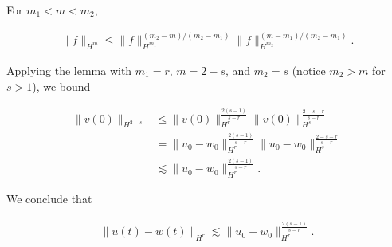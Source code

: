 \documentclass[handout]{beamer}
\numberwithin{equation}{section}
\begin{document}
 \begin{frame}
     \begin{lemma}[Interpolation]
  For $m_{1} < m < m_{2}$,
  
  
  \begin{equation*}
  \begin{split}
    \| f \|_{H^{m}} \le \| f \|_{H^{m_{1}}}^{(m_{2}-m)/(m_{2} - m_{1})} \| f
    \|_{H^{m_{2}}}^{(m -m_{1})/(m_{2} - m_{1})}.
  \end{split}
  \end{equation*}
  
  
  
   
  
\label{lem:interp}
\end{lemma}

Applying the lemma with $m_{1} =r$, $m = 2-s$, and $m_{2} = s$ (notice
$m_{2} > m$ for $s > 1$), we bound 


\begin{equation*}
\begin{split}
    \| v(0) \|_{H^{2-s}} 
    & \le \| v(0) \|_{H^{r}}^{\frac{2(s-1)}{s-r}} \|v(0)
  \|_{H^{s}}^{\frac{2-s-r}{s-r}}
  \\
  & = \| u_{0} - w_{0} \|_{H^{r}}^{\frac{2(s-1)}{s-r}} \|u_{0} - w_{0}
  \|_{H^{s}}^{\frac{2-s-r}{s-r}}
  \\
  & \lesssim \| u_{0} - w_{0} \|_{H^{r}}^{\frac{2(s-1)}{s-r}}.
\end{split}
\end{equation*}

We conclude that


\begin{equation*}
\begin{split}
  \| u(t) - w(t) \|_{H^{r}} \lesssim \|u_{0} - w_{0} \|_{H^{r}}^{\frac{2(s-1)}{s-r}}.
\end{split}
\end{equation*}

\end{frame}
\end{document}
